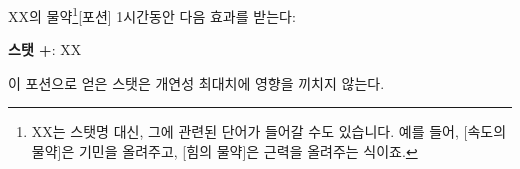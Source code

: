 \documentclass{report}
\begin{document}
	\begin{story}{XX의 물약\footnote{XX는 스탯명 대신, 그에 관련된 단어가 들어갈 수도 있습니다. 예를 들어, [속도의 물약]은 기민을 올려주고, [힘의 물약]은 근력을 올려주는 식이죠.}}{[포션]}
		1시간동안 다음 효과를 받는다:
		
		\textbf{스탯 +}: XX
		
		이 포션으로 얻은 스탯은 개연성 최대치에 영향을 끼치지 않는다.
		
	\end{story}
\end{document}
